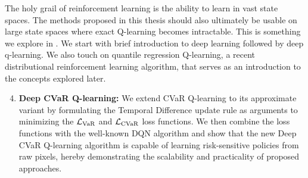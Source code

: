 The holy grail of reinforcement learning is the ability to learn in vast state spaces. The methods proposed in this thesis should also ultimately be usable on large state spaces where exact Q-learning becomes intractable. This is something we explore in .
We start with brief introduction to deep learning followed by deep q-learning. We also touch on quantile regression Q-learning, a recent distributional reinforcement learning algorithm, that serves as an introduction to the concepts explored later.

\begin{enumerate}
\setcounter{enumi}{3}
\item \textbf{Deep CVaR Q-learning:}  We extend CVaR Q-learning to its approximate variant by formulating the Temporal Difference update rule as arguments to minimizing the $\mathcal{L}_{\text{VaR}}$ and $\mathcal{L}_{\text{CVaR}}$ loss functions. We then combine the loss functions with the well-known DQN \citep{mnih2015human} algorithm and show that the new Deep CVaR Q-learning algorithm is capable of learning risk-sensitive policies from raw pixels, hereby demonstrating the scalability and practicality of proposed approaches.
\end{enumerate}


